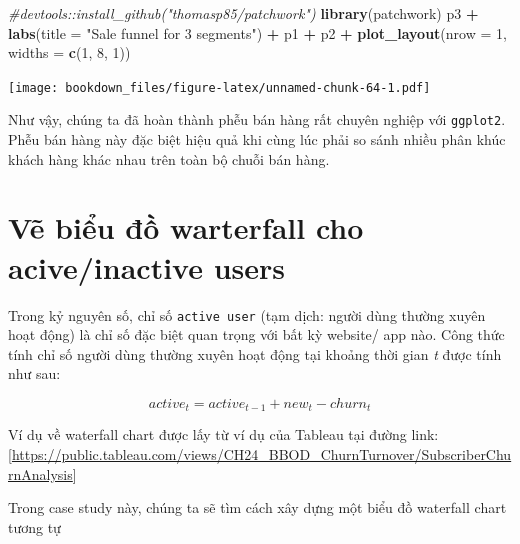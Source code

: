 \documentclass[]{krantz}
\makeatletter
\newenvironment{Shaded}{\begin{snugshade}}{\end{snugshade}}
\newcommand{\CommentTok}[1]{\textcolor[rgb]{0.37,0.37,0.37}{\textit{#1}}}
\newcommand{\DataTypeTok}[1]{\textcolor[rgb]{0.27,0.27,0.27}{#1}}
\newcommand{\DecValTok}[1]{\textcolor[rgb]{0.06,0.06,0.06}{#1}}
\newcommand{\KeywordTok}[1]{\textcolor[rgb]{0.27,0.27,0.27}{\textbf{#1}}}
\newcommand{\NormalTok}[1]{#1}
\newcommand{\OperatorTok}[1]{\textcolor[rgb]{0.43,0.43,0.43}{\textbf{#1}}}
\newcommand{\StringTok}[1]{\textcolor[rgb]{0.5,0.5,0.5}{#1}}
\newenvironment{kframe}{%
\medskip{}
\setlength{\fboxsep}{.8em}
 \def\at@end@of@kframe{}%
 \ifinner\ifhmode%
  \def\at@end@of@kframe{\end{minipage}}%
  \begin{minipage}{\columnwidth}%
 \fi\fi%
 \def\FrameCommand##1{\hskip\@totalleftmargin \hskip-\fboxsep
 \colorbox{shadecolor}{##1}\hskip-\fboxsep
     \hskip-\linewidth \hskip-\@totalleftmargin \hskip\columnwidth}%
 \MakeFramed {\advance\hsize-\width
   \@totalleftmargin\z@ \linewidth\hsize
   \@setminipage}}%
 {\par\unskip\endMakeFramed%
 \at@end@of@kframe}
\renewenvironment{Shaded}{\begin{kframe}}{\end{kframe}}
\renewenvironment{Shaded}{\begin{snugshade}}{\end{snugshade}}
\renewcommand{\CommentTok}[1]{\textcolor[rgb]{0.56,0.35,0.01}{\textit{#1}}}
\renewcommand{\DataTypeTok}[1]{\textcolor[rgb]{0.13,0.29,0.53}{#1}}
\renewcommand{\DecValTok}[1]{\textcolor[rgb]{0.00,0.00,0.81}{#1}}
\renewcommand{\KeywordTok}[1]{\textcolor[rgb]{0.13,0.29,0.53}{\textbf{#1}}}
\renewcommand{\NormalTok}[1]{#1}
\renewcommand{\OperatorTok}[1]{\textcolor[rgb]{0.81,0.36,0.00}{\textbf{#1}}}
\renewcommand{\StringTok}[1]{\textcolor[rgb]{0.31,0.60,0.02}{#1}}
\theoremstyle{definition}
\theoremstyle{definition}
\theoremstyle{definition}
\theoremstyle{remark}
\makeatother
\begin{document}
\begin{Shaded}
\begin{Highlighting}[]
\CommentTok{#devtools::install_github("thomasp85/patchwork")}
\KeywordTok{library}\NormalTok{(patchwork)}
\NormalTok{p3 }\OperatorTok{+}\StringTok{ }
\StringTok{  }\KeywordTok{labs}\NormalTok{(}\DataTypeTok{title =} \StringTok{"Sale funnel for 3 segments"}\NormalTok{) }\OperatorTok{+}
\StringTok{  }\NormalTok{p1 }\OperatorTok{+}\StringTok{ }\NormalTok{p2 }\OperatorTok{+}\StringTok{ }
\StringTok{  }\KeywordTok{plot_layout}\NormalTok{(}\DataTypeTok{nrow =} \DecValTok{1}\NormalTok{, }\DataTypeTok{widths =} \KeywordTok{c}\NormalTok{(}\DecValTok{1}\NormalTok{, }\DecValTok{8}\NormalTok{, }\DecValTok{1}\NormalTok{))}
\end{Highlighting}
\end{Shaded}

\texttt{[image: bookdown\_files/figure-latex/unnamed-chunk-64-1.pdf]}

Như vậy, chúng ta đã hoàn thành phễu bán hàng rất chuyên nghiệp với
\texttt{ggplot2}. Phễu bán hàng này đặc biệt hiệu quả khi cùng lúc phải
so sánh nhiều phân khúc khách hàng khác nhau trên toàn bộ chuỗi bán
hàng.

\hypertarget{ve-biu--warterfall-cho-aciveinactive-users}{%
\section{Vẽ biểu đồ warterfall cho acive/inactive
users}\label{ve-biu--warterfall-cho-aciveinactive-users}}

Trong kỷ nguyên số, chỉ số \texttt{active\ user} (tạm dịch: người dùng
thường xuyên hoạt động) là chỉ số đặc biệt quan trọng với bất kỳ
website/ app nào. Công thức tính chỉ số người dùng thường xuyên hoạt
động tại khoảng thời gian \emph{t} được tính như sau:

\[active_{t} = active_{t-1} + new_{t} - churn_{t}\]

Ví dụ về waterfall chart được lấy từ ví dụ của Tableau tại đường link:
{[}\url{https://public.tableau.com/views/CH24_BBOD_ChurnTurnover/SubscriberChurnAnalysis}{]}

Trong case study này, chúng ta sẽ tìm cách xây dựng một biểu đồ
waterfall chart tương tự
\end{document}
